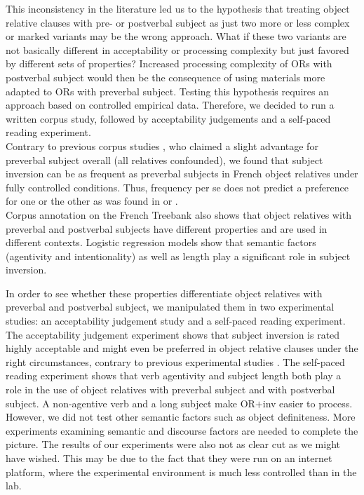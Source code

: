 \documentclass[output=paper]{langscibook}
\begin{document}
This inconsistency in the literature led us to the hypothesis that treating object relative clauses with pre- or postverbal subject as just two more or less complex or marked variants may be the wrong approach. What if these two variants are not basically different in acceptability or processing complexity but just favored by different sets of properties?  Increased processing complexity of ORs with postverbal subject would then be the consequence of using materials more adapted to ORs with preverbal subject. Testing this hypothesis requires an approach based on controlled empirical data. Therefore, we decided to run a written corpus study, followed by acceptability judgements and a self-paced reading experiment. \\
Contrary to previous corpus studies \citep{catherine1997}, who claimed a slight advantage for preverbal subject overall (all relatives confounded), we found that subject inversion can be as frequent as preverbal subjects in French object relatives under fully controlled conditions. Thus, frequency per se does not predict a preference for one or the other as was found in \citet{Frauenfelder1980} or \citet{pozniak2015processing}. \\
Corpus annotation on the French Treebank \citep{abeille2019corpus} also shows that object relatives with preverbal and postverbal subjects have different properties and are used in different contexts. Logistic regression models \citep{baayen2008mixed} show that semantic factors (agentivity and intentionality) as well as length play a significant role in subject inversion. 

In order to see whether these properties differentiate object relatives with preverbal and postverbal subject, we manipulated them in two experimental studies: an acceptability judgement study and a self-paced reading experiment. The acceptability judgement experiment shows that subject inversion is rated highly acceptable and might even be preferred in object relative clauses under the right circumstances, contrary to previous experimental studies \citep{Holmes1981, baudiffier2011effect, pozniak2015processing}. The self-paced reading experiment shows that verb agentivity and subject length both play a role in the use of object relatives with preverbal subject and with postverbal subject. A non-agentive verb and a long subject make OR$+$inv easier to process. However, we did not test other semantic factors such as object definiteness. More experiments examining semantic and discourse factors are needed to complete the picture. The results of our experiments were also not as clear cut as we might have wished. This may be due to the fact that they were run on an internet platform, where the experimental environment is much less controlled than in the lab. \\
\end{document}
